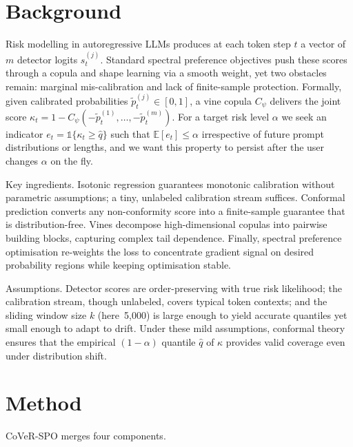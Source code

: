 \documentclass{article}
\begin{document}
\section{Background}
Risk modelling in autoregressive LLMs produces at each token step $t$ a vector of $m$ detector logits $s_{t}^{(j)}$. Standard spectral preference objectives push these scores through a copula and shape learning via a smooth weight, yet two obstacles remain: marginal mis-calibration and lack of finite-sample protection. Formally, given calibrated probabilities $\tilde p_{t}^{(j)} \in [0,1]$, a vine copula $C_{\psi}$ delivers the joint score $\kappa_{t} = 1 - C_{\psi}(-\tilde p_{t}^{(1)}, \ldots, -\tilde p_{t}^{(m)})$. For a target risk level $\alpha$ we seek an indicator $e_{t} = \mathbb{1}\{\kappa_{t} \ge \hat q\}$ such that $\mathbb{E}[e_{t}] \le \alpha$ irrespective of future prompt distributions or lengths, and we want this property to persist after the user changes $\alpha$ on the fly.

Key ingredients. Isotonic regression guarantees monotonic calibration without parametric assumptions; a tiny, unlabeled calibration stream suffices. Conformal prediction converts any non-conformity score into a finite-sample guarantee that is distribution-free. Vines decompose high-dimensional copulas into pairwise building blocks, capturing complex tail dependence. Finally, spectral preference optimisation re-weights the loss to concentrate gradient signal on desired probability regions while keeping optimisation stable.

Assumptions. Detector scores are order-preserving with true risk likelihood; the calibration stream, though unlabeled, covers typical token contexts; and the sliding window size $k$ (here~5{,}000) is large enough to yield accurate quantiles yet small enough to adapt to drift. Under these mild assumptions, conformal theory ensures that the empirical $(1-\alpha)$ quantile $\hat q$ of $\kappa$ provides valid coverage even under distribution shift.

\section{Method}
CoVeR-SPO merges four components.
\end{document}
